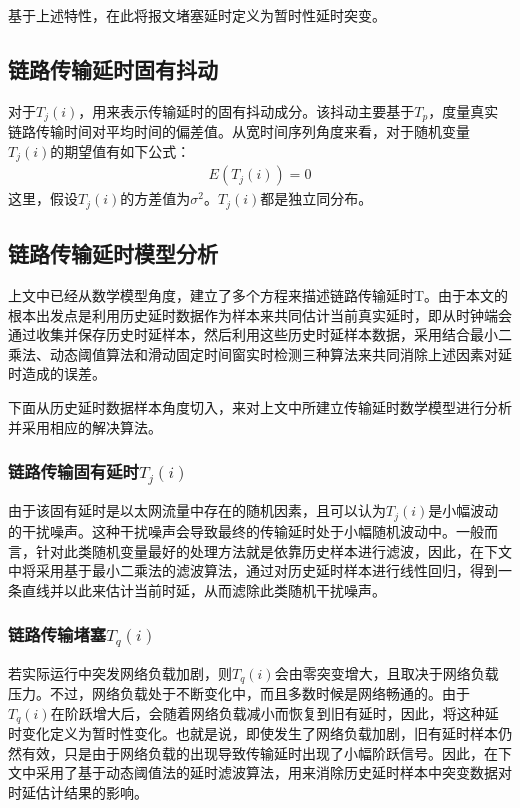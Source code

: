 基于上述特性，在此将报文堵塞延时定义为暂时性延时突变。

\subsection{链路传输延时固有抖动}
对于$T_{j}(i)$，用来表示传输延时的固有抖动成分。该抖动主要基于$T_{p}$，度量真实链路传输时间对平均时间的偏差值。从宽时间序列角度来看，对于随机变量$T_{j}(i)$的期望值有如下公式：
\begin {align}
E(T_{j}(i)) = 0
\end {align}
这里，假设$T_{j}(i)$的方差值为$\sigma ^{2}$。$T_{j}(i)$都是独立同分布。

\subsection{链路传输延时模型分析}
上文中已经从数学模型角度，建立了多个方程来描述链路传输延时T。由于本文的根本出发点是利用历史延时数据作为样本来共同估计当前真实延时，即从时钟端会通过收集并保存历史时延样本，然后利用这些历史时延样本数据，采用结合最小二乘法、动态阈值算法和滑动固定时间窗实时检测三种算法来共同消除上述因素对延时造成的误差。

下面从历史延时数据样本角度切入，来对上文中所建立传输延时数学模型进行分析并采用相应的解决算法。

\subsubsection{链路传输固有延时$T_{j}(i)$}
由于该固有延时是以太网流量中存在的随机因素，且可以认为$T_{j}(i)$是小幅波动的干扰噪声。这种干扰噪声会导致最终的传输延时处于小幅随机波动中。一般而言，针对此类随机变量最好的处理方法就是依靠历史样本进行滤波，因此，在下文中将采用基于最小二乘法的滤波算法，通过对历史延时样本进行线性回归，得到一条直线并以此来估计当前时延，从而滤除此类随机干扰噪声。

\subsubsection{链路传输堵塞$T_{q}(i)$}
若实际运行中突发网络负载加剧，则$T_{q}(i)$会由零突变增大，且取决于网络负载压力。不过，网络负载处于不断变化中，而且多数时候是网络畅通的。由于$T_{q}(i)$在阶跃增大后，会随着网络负载减小而恢复到旧有延时，因此，将这种延时变化定义为暂时性变化。也就是说，即使发生了网络负载加剧，旧有延时样本仍然有效，只是由于网络负载的出现导致传输延时出现了小幅阶跃信号。因此，在下文中采用了基于动态阈值法的延时滤波算法，用来消除历史延时样本中突变数据对时延估计结果的影响。

